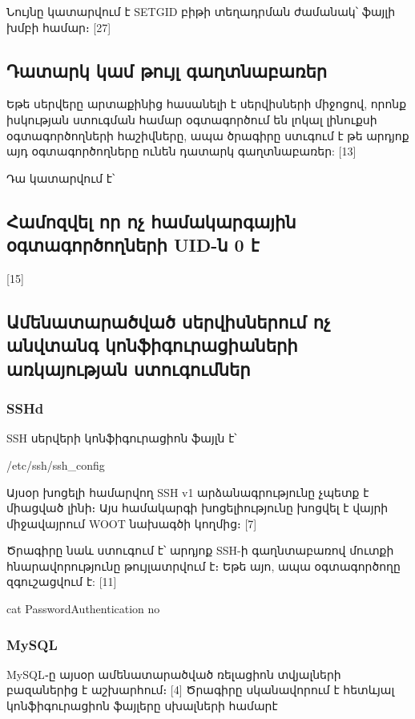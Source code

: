 \documentclass[12pt]{article}
\begin{document}
\begin{sloppypar}
Նույնը կատարվում է SETGID բիթի տեղադրման ժամանակ՝
ֆայլի խմբի համար։
[27]


\subsection{Դատարկ կամ թույլ գաղտնաբառեր}

Եթե սերվերը արտաքինից հասանելի է սերվիսների միջոցով,
որոնք իսկության ստուգման համար օգտագործում են լոկալ
լինուքսի օգտագործողների հաշիվները, ապա ծրագիրը ստւգում է
թե արդյոք այդ օգտագործողները ունեն դատարկ գաղտնաբառեր: [13]

Դա կատարվում է՝



\subsection{Համոզվել որ ոչ համակարգային օգտագործողների UID-ն 0 է}

[15]


\subsection{Ամենատարածված սերվիսներում ոչ անվտանգ կոնֆիգուրացիաների առկայության ստուգումներ}

\subsubsection{SSHd}

SSH սերվերի կոնֆիգուրացիոն ֆայլն է՝

    /etc/ssh/ssh\_config

Այսօր խոցելի համարվող SSH v1 արձանագրությունը չպետք է միացված լինի։
Այս համակարգի խոցելիությունը խոցվել է վայրի միջավայրում WOOT
նախագծի կողմից։ [7]

Ծրագիրը նաև ստուգում է՝ արդյոք SSH-ի գաղնտաբառով մուտքի
հնարավորությունը թույլատրվում է։ Եթե այո, ապա օգտագործողը
զգուշացվում է: [11]

    cat PasswordAuthentication no

\subsubsection{MySQL}

MySQL֊ը այսօր ամենատարածված ռելացիոն տվյալների բազաներից է աշխարհում։ [4]
Ծրագիրը սկանավորում է հետևյալ կոնֆիգուրացիոն ֆայլերը սխալների համարէ


\end{sloppypar}
\end{document}
